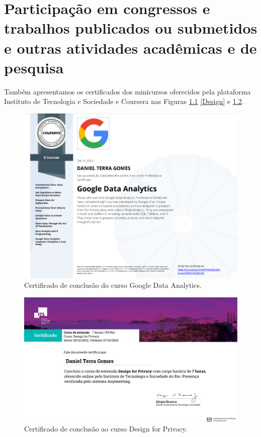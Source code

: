 \chapter{Participação em congressos e trabalhos publicados ou submetidos e outras
atividades acadêmicas e de pesquisa} \label{eventos}

Também apresentamos os certificados dos minicursos oferecidos pela plataforma Instituto de Tecnologia e Sociedade e Coursera nas Figuras \ref{Google} \ref{Design} e \ref{Direitos}.


\begin{figure}[H]
\centering
\includegraphics[width=\textwidth]{Figures/google.png}
\caption{Certificado de conclusão do curso Google Data Analytics.}
\label{Google}
\end{figure}

\begin{figure}[H]
\centering
\includegraphics[width=\textwidth]{Figures/its2.pdf}
\caption{Certificado de conclusão ao curso Design for Privacy.}
\label{Direitos}
\end{figure}

